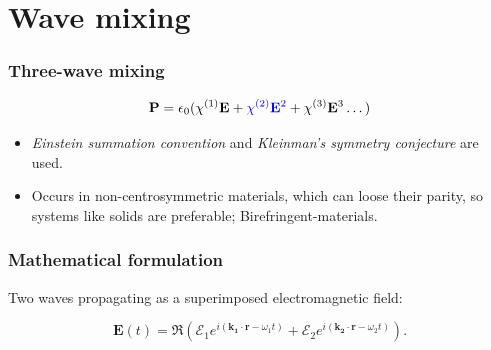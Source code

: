 \section{Wave mixing} 

\begin{frame}
  \frametitle{Three-wave mixing}
  \[
  \mathbf P = \epsilon_0 ( \chi^{\textup{(1)}} \mathbf E +
  \textcolor{blue}{\chi^{\textup{(2)}} \mathbf E^2} + \chi^{\textup{(3)}} \mathbf E^3 \dots )
  \]
  \begin{itemize}
  \item \textit{Einstein summation convention} and
    \textit{Kleinman's symmetry conjecture} are used.
  \item Occurs in non-centrosymmetric materials, which can loose
    their parity, so systems like solids are preferable; Birefringent-materials.
  \end{itemize}

  

\end{frame}

\begin{frame}
  \frametitle{Mathematical formulation}

  Two waves propagating as a superimposed electromagnetic field: 

  \[
  \mathbf{\mathbf{E}}(t) = \Re\left(\mathcal{E}_1e^{i(\mathbf{k_1} \cdot \mathbf{r} - \omega_1 t)}+\mathcal{E}_2e^{i(\mathbf{k_2} \cdot \mathbf{r} - \omega_2 t)} \right).
  \]




  
\end{frame}
  
